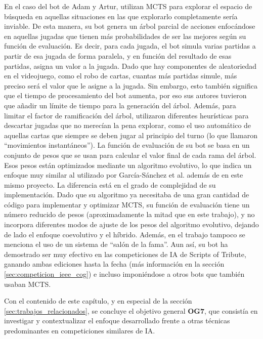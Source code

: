 En el caso del bot de Adam y Artur, utilizan MCTS para explorar el espacio de búsqueda en aquellas situaciones en las que explorarlo completamente sería inviable. De esta manera, su bot genera un árbol parcial de acciones enfocándose en aquellas jugadas que tienen más probabilidades de ser las mejores según su función de evaluación. Es decir, para cada jugada, el bot simula varias partidas a partir de esa jugada de forma paralela, y en función del resultado de esas partidas, asigna un valor a la jugada. Dado que hay componentes de aleatoriedad en el videojuego, como el robo de cartas, cuantas más partidas simule, más preciso será el valor que le asigne a la jugada. Sin embargo, esto también significa que el tiempo de procesamiento del bot aumenta, por eso sus autores tuvieron que añadir un límite de tiempo para la generación del árbol. Además, para limitar el factor de ramificación del árbol, utilizaron diferentes heurísticas para descartar jugadas que no merecían la pena explorar, como el uso automático de aquellas cartas que siempre se deben jugar al principio del turno (lo que llamaron ``movimientos instantáneos''). La función de evaluación de su bot se basa en un conjunto de pesos que se usan para calcular el valor final de cada rama del árbol. Esos pesos están optimizados mediante un algoritmo evolutivo, lo que indica un enfoque muy similar al utilizado por García-Sánchez et al. además de en este mismo proyecto. La diferencia está en el grado de complejidad de su implementación. Dado que su algoritmo ya necesitaba de una gran cantidad de código para implementar y optimizar MCTS, su función de evaluación tiene un número reducido de pesos (aproximadamente la mitad que en este trabajo), y no incorpora diferentes modos de ajuste de los pesos del algoritmo evolutivo, dejando de lado el enfoque coevolutivo y el híbrido. Además, en el trabajo tampoco se menciona el uso de un sistema de ``salón de la fama''. Aun así, su bot ha demostrado ser muy efectivo en las competiciones de IA de Scripts of Tribute, ganando ambas ediciones hasta la fecha (más información en la sección \ref{sec:competicion_ieee_cog}) e incluso imponiéndose a otros bots que también usaban MCTS.

Con el contenido de este capítulo, y en especial de la sección \ref{sec:trabajos_relacionados}, se concluye el objetivo general \textbf{OG7}, que consistía en investigar y contextualizar el enfoque desarrollado frente a otras técnicas predominantes en competiciones similares de IA.